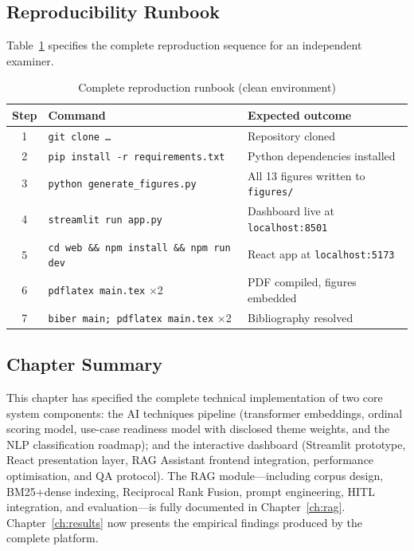 \subsection{Reproducibility Runbook}
\label{sec:runbook-full}

Table~\ref{tab:runbook} specifies the complete reproduction sequence for an
independent examiner.

\begin{table}[htbp]
\centering
\caption{Complete reproduction runbook (clean environment)}
\label{tab:runbook}
\begin{tabular}{@{}clp{6.2cm}@{}}
\toprule
\textbf{Step} & \textbf{Command} & \textbf{Expected outcome} \\
\midrule
1 & \texttt{git clone \ldots} & Repository cloned \\
2 & \texttt{pip install -r requirements.txt} & Python dependencies installed \\
3 & \texttt{python generate\_figures.py} & All 13 figures written to \texttt{figures/} \\
4 & \texttt{streamlit run app.py} & Dashboard live at \texttt{localhost:8501} \\
5 & \texttt{cd web \&\& npm install \&\& npm run dev} & React app at \texttt{localhost:5173} \\
6 & \texttt{pdflatex main.tex} $\times$2 & PDF compiled, figures embedded \\
7 & \texttt{biber main; pdflatex main.tex} $\times$2 & Bibliography resolved \\
\bottomrule
\end{tabular}
\end{table}

\subsection{Chapter Summary}
\label{sec:techimpl-summary}

This chapter has specified the complete technical implementation of two core system
components: the AI techniques pipeline (transformer embeddings, ordinal scoring model,
use-case readiness model with disclosed theme weights, and the NLP classification
roadmap); and the interactive dashboard (Streamlit prototype, React presentation layer,
RAG Assistant frontend integration, performance optimisation, and QA protocol). The
RAG module---including corpus design, BM25+dense indexing, Reciprocal Rank Fusion,
prompt engineering, HITL integration, and evaluation---is fully documented in
Chapter~\ref{ch:rag}. Chapter~\ref{ch:results} now presents the empirical findings
produced by the complete platform.
